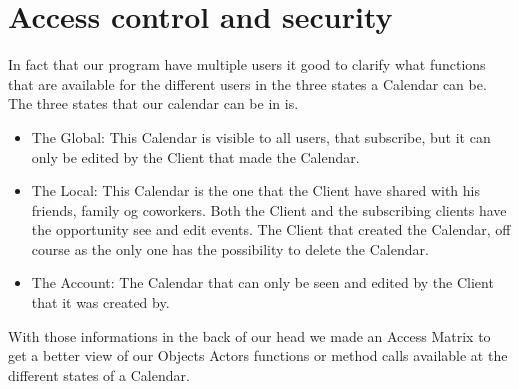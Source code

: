 \section{Access control and security}

In fact that our program have multiple users it good to clarify what functions that are available for the different users in the three states a Calendar can be. The three states that our calendar can be in is.

\begin{itemize}
	\item The Global: This Calendar is visible to all users, that subscribe, but it can only be edited by the Client that made the Calendar.
	\item The Local: This Calendar is the one that the Client have shared with his friends, family og coworkers. Both the Client and the subscribing clients have the opportunity see and edit events. The Client that created the Calendar, off course as the only one has the possibility to delete the Calendar.
	\item The Account: The Calendar that can only be seen and edited by the Client that it was created by. 
\end{itemize}

With those informations in the back of our head we made an Access Matrix to get a better view of our Objects Actors functions or method calls available at the different states of a Calendar. 

